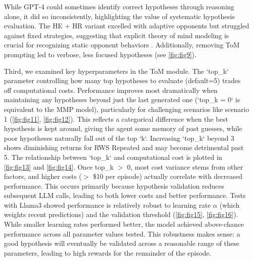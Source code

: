 \documentclass{article} %
\begin{document}
While GPT-4 could sometimes identify correct hypotheses through reasoning alone, it did so inconsistently, highlighting the value of systematic hypothesis evaluation. The HE + HR variant excelled with adaptive opponents but struggled against fixed strategies, suggesting that explicit theory of mind modeling is crucial for recognizing static opponent behaviors \citep{rakoczy2022foundations}. Additionally, removing ToM prompting led to verbose, less focused hypotheses (see \autoref{fig:fig9}).

Third, we examined key hyperparameters in the ToM module. The `top\_k` parameter controlling how many top hypotheses to evaluate (default=5) trades off computational costs. Performance improves most dramatically when maintaining any hypotheses beyond just the last generated one (`top\_k = 0` is equivalent to the MMP model), particularly for challenging scenarios like scenario 1 (\autoref{fig:fig11}, \autoref{fig:fig12}). This reflects a categorical difference when the best hypothesis is kept around, giving the agent some memory of past guesses, while poor hypotheses naturally fall out of the top `k`. Increasing `top\_k` beyond 3 shows diminishing returns for RWS Repeated and may become detrimental past 5. The relationship between `top\_k` and computational cost is plotted in \autoref{fig:fig13} and \autoref{fig:fig14}. Once top\_k $>$ 0, most cost variance stems from other factors, and higher costs ($>$ \$10 per episode) actually correlate with decreased performance. This occurs primarily because hypothesis validation reduces subsequent LLM calls, leading to both lower costs and better performance. Tests with Llama3 showed performance is relatively robust to learning rate $\alpha$ (which weights recent predictions) and the validation threshold (\autoref{fig:fig15}, \autoref{fig:fig16}). While smaller learning rates performed better, the model achieved above-chance performance across all parameter values tested. This robustness makes sense: a good hypothesis will eventually be validated across a reasonable range of these parameters, leading to high rewards for the remainder of the episode.
\end{document}
